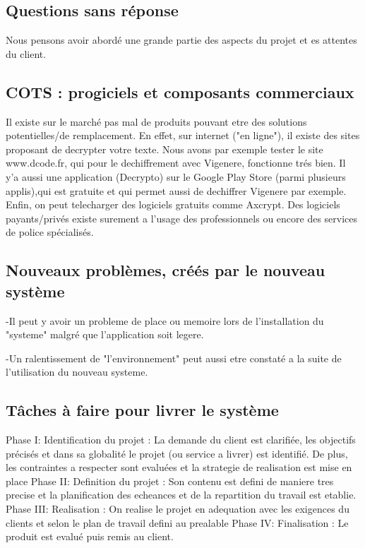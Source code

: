 \documentclass[a4]{article}
\begin{document}
		\subsection{Questions sans réponse}
		Nous pensons avoir abordé une grande partie des aspects du projet et es attentes du client.
		\subsection{COTS : progiciels et composants commerciaux}
		Il existe sur le marché pas mal de produits pouvant etre des solutions potentielles/de remplacement. En effet, sur internet
		("en ligne"), il existe des sites proposant de decrypter votre texte. Nous avons par exemple tester le site www.dcode.fr, qui
		pour le dechiffrement avec Vigenere, fonctionne trés bien.
		Il y'a aussi une application (Decrypto) sur le Google Play Store (parmi plusieurs applis),qui est gratuite et qui permet aussi de dechiffrer Vigenere par exemple.
		Enfin, on peut telecharger des logiciels gratuits comme Axcrypt. Des logiciels payants/privés existe surement a l'usage des
		professionnels ou encore des services de police spécialisés.
		\subsection{Nouveaux problèmes, créés par le nouveau système}
		-Il peut y avoir un probleme de place ou memoire lors de l'installation du "systeme" malgré que l'application soit legere.
		
		-Un ralentissement de "l'environnement" peut aussi etre constaté a la suite de l'utilisation du nouveau systeme.
		\subsection{Tâches à faire pour livrer le système}
		Phase I: Identification du projet : La demande du client est clarifiée, les objectifs précisés et dans sa globalité le projet (ou service a livrer) est identifié. De plus, les contraintes a respecter sont evaluées et la strategie de realisation est mise en place
		Phase II: Definition du projet : Son contenu est defini de maniere tres precise et la planification des echeances et de la repartition du travail est etablie.
		Phase III: Realisation : On realise le projet en adequation avec les exigences du clients et selon le plan de travail defini au prealable
		Phase IV: Finalisation : Le produit est evalué puis remis au client.
		
		
		
\end{document}
